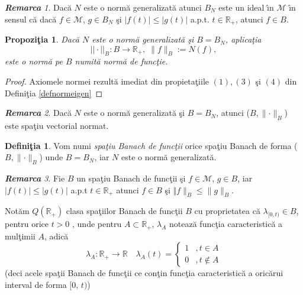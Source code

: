 \documentclass[ a4paper, 12pt]{report}
\newtheorem{prop}[theorem]{\bf Propozi\c tia }
\theoremstyle{definition}
\newtheorem{definition}{\bf Defini\c tia}[section]
\theoremstyle{remark}
\newtheorem{remarc}{\bf Remarca}[section]
\numberwithin{equation}{section}
\begin{document}
\begin{remarc}
 Dac\u a $N$ este o norm\u a generalizat\u a atunci $B_N$ este un ideal \^\i n $\mathcal{M}$ \^\i n sensul c\u a dac\u a $f \in \mathcal{M}$, $g \in B_N$  \c si $\lvert f(t) \rvert \leqslant \lvert g(t) \rvert$ a.p.t. $t \in \mathbb{R}_+$, atunci $f \in B$.
\end{remarc}

\begin{prop}
Dac\u a $N$ este o norm\u a generalizat\u a \c si $B=B_N$, aplica\c tia
$$||\cdot||_B : B \to \mathbb{R}_+, \; \lVert  f \rVert_B := N(f),$$
este o norm\u a pe $B$ numit\u a \emph{norm\u a de func\c tie}.
\end{prop}

\begin{proof} Axiomele normei rezult\u a imediat din propieta\c tiile $(1), (3)$ \c si $(4)$ din Defini\c tia \ref{defnormeigen}
\end{proof}

\begin{remarc}
Dac\u a $N$ este o norm\u a generalizat\u a \c si $B=B_N$, atunci ($B,\lVert \cdot \rVert_B$) este spa\c tiu vectorial normat.
\end{remarc}

\begin{definition}
Vom numi {\it spa\c tiu Banach de func\c tii} orice spa\c tiu Banach de forma ($B,\lVert \cdot \rVert_B$) unde $B = B_N$, iar $N$ este o norm\u a generalizat\u a.
\end{definition}

\begin{remarc}
Fie $B$ un spa\c tiu Banach de func\c tii \c si $f \in \mathcal{M}$, $g \in B$, iar $\lvert f(t)\rvert \leqslant \lvert g(t)\rvert$ a.p.t $t \in \mathbb{R}_+$ atunci $f \in B$ \c si $\Vert f \rVert_B \leqslant \lVert g \rVert_B$.
\end{remarc}

\medskip

\noindent Not\u am $Q(\mathbb{R}_+)$ clasa spa\c tiilor Banach de func\c tii $B$ cu proprietatea c\u a $\lambda_{[0,t)} \in B$, pentru orice $t>0$ , unde
pentru $ A \subset \mathbb{R}_+ $, $\lambda_A$ noteaz\u a func\c tia caracteristic\u a a mul\c timii $A$, adic\u a
$$ \lambda_A : \mathbb{R}_+ \rightarrow \mathbb{R} \quad \lambda_A (t) =
\begin{cases}
1 &, t \in A \\
0 &, t \notin A
\end{cases}$$
(deci acele spa\c tii Banach de func\c tii ce con\c tin func\c tia caracteristic\u a a oric\u arui interval de forma $[0, \, t)$)
\end{document}
